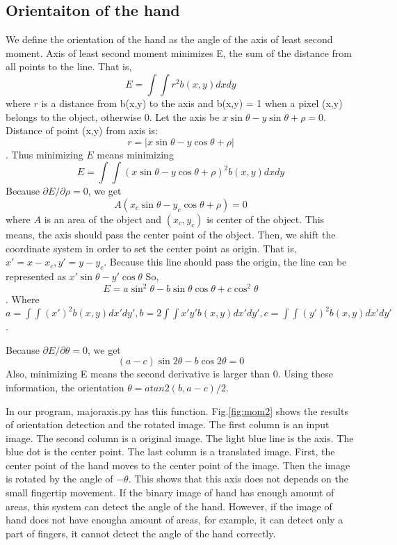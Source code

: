 \subsection{Orientaiton of the hand}
We define the orientation of the hand as the angle of the axis of least second moment.
Axis of least second moment minimizes E, the sum of the distance from all points to the line. That is,
$$E = \int \int r^2 b(x,y) dxdy$$
where $r$ is a distance from b(x,y) to the axis and b(x,y) = 1 when a pixel (x,y) belongs to the object, otherwise 0.
Let the axis be $x\sin{\theta} - y\sin{\theta} + \rho = 0$.
Distance of point (x,y) from axis is:
$$r = |x\sin{\theta}-y\cos{\theta}+\rho|$$.
Thus minimizing $E$ means minimizing
$$E = \int\int (x\sin{\theta}-y\cos{\theta}+\rho)^2 b(x,y)dxdy$$
Because $\partial E / \partial \rho = 0$, we get
$$A(x_c \sin{\theta} - y_c \cos{\theta} + \rho) = 0$$
where $A$ is an area of the object and $(x_c,y_c)$ is center of the object.
This means, the axis should pass the center point of the object.
Then, we shift the coordinate system in order to set the center point as origin.
That is, 
$x'= x - x_c, y' = y - y_c$.
Because this line should pass the origin, the line can be represented as
$x'\sin{\theta}-y'\cos{\theta}$
So, $$E = a \sin^2{\theta} - b\sin{\theta}\cos{\theta} + c\cos^2{\theta}$$.
Where $a = \int\int (x')^2 b(x,y) dx'dy', b = 2\int\int x'y' b(x,y) dx'dy', 
c = \int\int (y')^2 b(x,y)dx'dy'$.\par
Because $\partial E / \partial \theta = 0$, we get
$$(a-c)\sin{2\theta} - b\cos{2\theta} = 0$$
Also, minimizing E means the second derivative is larger than 0.
Using these information, the orientation $\theta = atan2(b,a-c)/2$.\par
In our program, majoraxis.py has this function.
Fig.\ref{fig:mom2} shows the results of orientation detection and the rotated image.
The first column is an input image.
The second column is a original image. The light blue line is the axis. The blue dot is the center point.
The last column is a translated image. First, the center point of the hand moves to the center point of the image.
Then the image is rotated by the angle of $-\theta$.
This shows that this axis does not depends on the small fingertip movement.
If the binary image of hand has enough amount of areas, this system can detect the angle of the hand.
However, if the image of hand does not have enougha amount of areas, for example, it can detect only a part of fingers,
it cannot detect the angle of the hand correctly.
